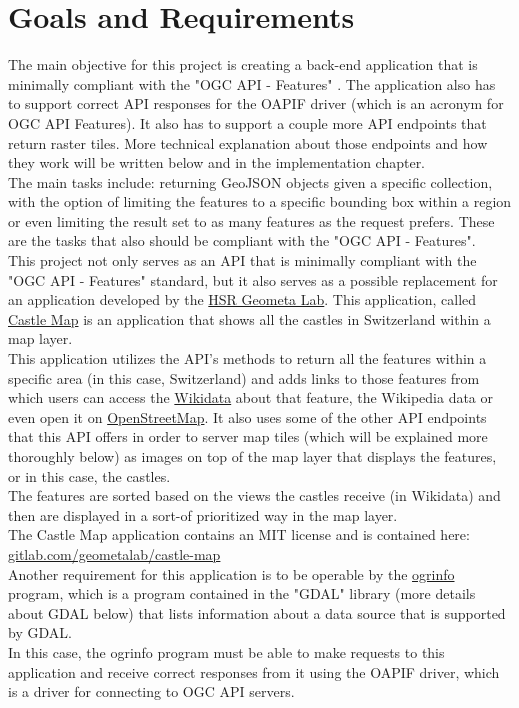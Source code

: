 \section{Goals and Requirements}
The main objective for this project is creating a back-end application that is minimally compliant with the "OGC API - Features" \cite{OGCApiFeatures}. The application also has to support correct API responses for the OAPIF \cite{OAPIF} driver (which is an acronym for OGC API Features). It also has to support a couple more API endpoints that return raster tiles. More technical explanation about those endpoints and how they work will be written below and in the implementation chapter.\\
The main tasks include: returning GeoJSON objects given a specific collection, with the option of limiting the features to a specific bounding box within a region or even limiting the result set to as many features as the request prefers. These are the tasks that also should be compliant with the "OGC API - Features".\\
\newline
This project not only serves as an API that is minimally compliant with the "OGC API - Features" standard, but it also serves as a possible replacement for an application developed by the \href{https://www.hsr.ch/geometalab}{HSR Geometa Lab}. This application, called \href{https://castle-map.infs.ch/}{Castle Map} is an application that shows all the castles in Switzerland within a map layer.\\
This application utilizes the API's methods to return all the features within a specific area (in this case, Switzerland) and adds links to those features from which users can access the \href{https://www.wikidata.org/wiki/Wikidata:Main_Page}{Wikidata} about that feature, the Wikipedia data or even open it on \href{https://www.openstreetmap.org/node/1500554009}{OpenStreetMap}. It also uses some of the other API endpoints that this API offers in order to server map tiles (which will be explained more thoroughly below) as images on top of the map layer that displays the features, or in this case, the castles.\\
The features are sorted based on the views the castles receive (in Wikidata) and then are displayed in a sort-of prioritized way in the map layer.\\
The Castle Map application contains an MIT license and is contained here:\\ \href{https://gitlab.com/geometalab/castle-map}{gitlab.com/geometalab/castle-map}\\
\newline
Another requirement for this application is to be operable by the \href{https://gdal.org/programs/ogrinfo.html}{ogrinfo} program, which is a program contained in the "GDAL" library (more details about GDAL below) that lists information about a data source that is supported by GDAL.\\
In this case, the ogrinfo program must be able to make requests to this application and receive correct responses from it using the OAPIF driver, which is a driver for connecting to OGC API servers. 
\newpage

